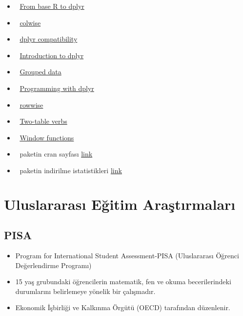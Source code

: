 \documentclass[
  oneside]{book}
\begin{document}
\begin{itemize}
\item
  🔗 \href{https://cran.r-project.org/web/packages/dplyr/vignettes/base.html}{From base R to dplyr}
\item
  🔗 \href{https://cran.r-project.org/web/packages/dplyr/vignettes/colwise.html}{colwise}
\item
  🔗 \href{https://cran.r-project.org/web/packages/dplyr/vignettes/compatibility.html}{dplyr compatibility}
\item
  🔗 \href{https://cran.r-project.org/web/packages/dplyr/vignettes/dplyr.html}{Introduction to dplyr}
\item
  🔗 \href{https://cran.r-project.org/web/packages/dplyr/vignettes/grouping.html}{Grouped data}
\item
  🔗 \href{https://cran.r-project.org/web/packages/dplyr/vignettes/programming.html}{Programming with dplyr}
\item
  🔗 \href{https://cran.r-project.org/web/packages/dplyr/vignettes/rowwise.html}{rowwise}
\item
  🔗 \href{https://cran.r-project.org/web/packages/dplyr/vignettes/two-table.html}{Two-table verbs}
\item
  🔗 \href{https://cran.r-project.org/web/packages/dplyr/vignettes/window-functions.html}{Window functions}
\item
  🔗 paketin cran sayfası \href{https://cran.r-project.org/web/packages/dplyr/index.html}{link}
\item
  🔗 paketin indirilme istatistikleri \href{https://ipub.com/dev-corner/apps/r-package-downloads/}{link}
\end{itemize}

\hypertarget{uluslararasux131-eux11fitim-araux15ftux131rmalarux131}{%
\section{Uluslararası Eğitim Araştırmaları}\label{uluslararasux131-eux11fitim-araux15ftux131rmalarux131}}

\hypertarget{pisa}{%
\subsection{PISA}\label{pisa}}

\begin{itemize}
\item
  Program for International Student Assessment-PISA (Uluslararası Öğrenci Değerlendirme Programı)
\item
  15 yaş grubundaki öğrencilerin matematik, fen ve okuma
  becerilerindeki durumlarını belirlemeye yönelik bir çalışmadır.
\item
  Ekonomik İşbirliği ve Kalkınma Örgütü (OECD) tarafından düzenlenir.
\end{itemize}
\end{document}
